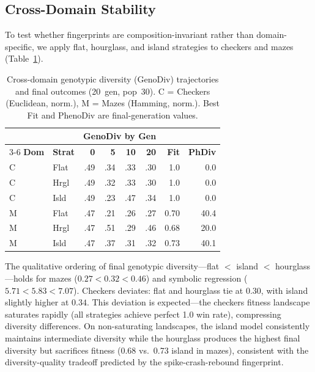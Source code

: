 \documentclass[sigconf]{acmart}
\begin{document}
\subsection{Cross-Domain Stability}

To test whether fingerprints are composition-invariant rather than domain-specific, we apply flat, hourglass, and island strategies to checkers and mazes (Table~\ref{tab:cross-domain}).

\begin{table}[ht]
\centering
\caption{Cross-domain genotypic diversity (GenoDiv) trajectories and final outcomes (20~gen, pop~30). C = Checkers (Euclidean, norm.), M = Mazes (Hamming, norm.). Best Fit and PhenoDiv are final-generation values.}
\label{tab:cross-domain}
\begin{tabular}{@{}llrrrrrr@{}}
\toprule
& & \multicolumn{4}{c}{\textbf{GenoDiv by Gen}} & & \\
\cmidrule(lr){3-6}
\textbf{Dom} & \textbf{Strat} & \textbf{0} & \textbf{5} & \textbf{10} & \textbf{20} & \textbf{Fit} & \textbf{PhDiv} \\
\midrule
C & Flat  & .49 & .34 & .33 & .30 & 1.0  & 0.0 \\
C & Hrgl  & .49 & .32 & .33 & .30 & 1.0  & 0.0 \\
C & Isld  & .49 & .23 & .47 & .34 & 1.0  & 0.0 \\
M & Flat  & .47 & .21 & .26 & .27 & 0.70 & 40.4 \\
M & Hrgl  & .47 & .51 & .29 & .46 & 0.68 & 20.0 \\
M & Isld  & .47 & .37 & .31 & .32 & 0.73 & 40.1 \\
\bottomrule
\end{tabular}
\end{table}

The qualitative ordering of final genotypic diversity---flat $<$ island $<$ hourglass---holds for mazes ($0.27 < 0.32 < 0.46$) and symbolic regression ($5.71 < 5.83 < 7.07$). Checkers deviates: flat and hourglass tie at $0.30$, with island slightly higher at $0.34$. This deviation is expected---the checkers fitness landscape saturates rapidly (all strategies achieve perfect 1.0 win rate), compressing diversity differences. On non-saturating landscapes, the island model consistently maintains intermediate diversity while the hourglass produces the highest final diversity but sacrifices fitness (0.68 vs.\ 0.73 island in mazes), consistent with the diversity-quality tradeoff predicted by the spike-crash-rebound fingerprint.
\end{document}
